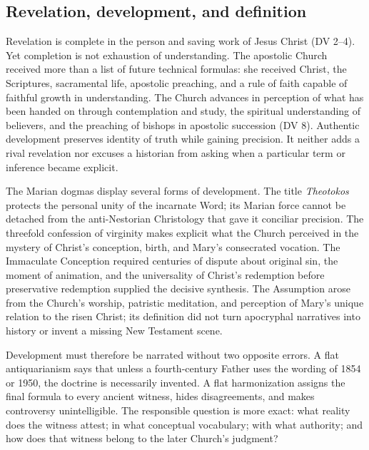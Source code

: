 \subsection{Revelation, development, and definition}

Revelation is complete in the person and saving work of Jesus Christ (DV 2--4). Yet completion is not exhaustion of understanding. The apostolic Church received more than a list of future technical formulas: she received Christ, the Scriptures, sacramental life, apostolic preaching, and a rule of faith capable of faithful growth in understanding. The Church advances in perception of what has been handed on through contemplation and study, the spiritual understanding of believers, and the preaching of bishops in apostolic succession (DV 8). Authentic development preserves identity of truth while gaining precision. It neither adds a rival revelation nor excuses a historian from asking when a particular term or inference became explicit.

The Marian dogmas display several forms of development. The title \emph{Theotokos} protects the personal unity of the incarnate Word; its Marian force cannot be detached from the anti-Nestorian Christology that gave it conciliar precision. The threefold confession of virginity makes explicit what the Church perceived in the mystery of Christ's conception, birth, and Mary's consecrated vocation. The Immaculate Conception required centuries of dispute about original sin, the moment of animation, and the universality of Christ's redemption before preservative redemption supplied the decisive synthesis. The Assumption arose from the Church's worship, patristic meditation, and perception of Mary's unique relation to the risen Christ; its definition did not turn apocryphal narratives into history or invent a missing New Testament scene.

Development must therefore be narrated without two opposite errors. A flat antiquarianism says that unless a fourth-century Father uses the wording of 1854 or 1950, the doctrine is necessarily invented. A flat harmonization assigns the final formula to every ancient witness, hides disagreements, and makes controversy unintelligible. The responsible question is more exact: what reality does the witness attest; in what conceptual vocabulary; with what authority; and how does that witness belong to the later Church's judgment?

